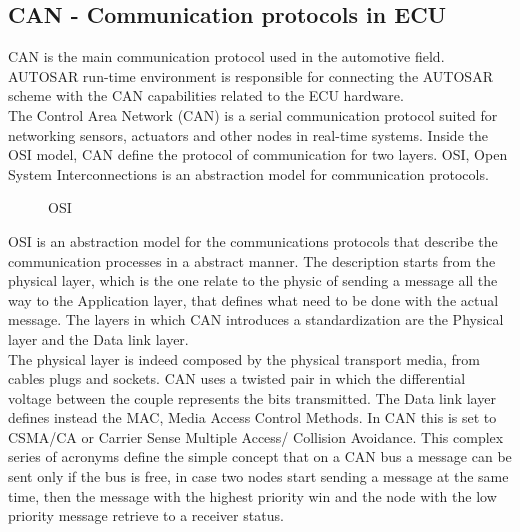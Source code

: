 \documentclass[../main.tex]{subfiles}
\begin{document}
\subsection{CAN - Communication protocols in ECU}
\gls{CAN} is the main communication protocol used in the automotive field. \gls{AUTOSAR} run-time environment is responsible for connecting the \gls{AUTOSAR} scheme with the \gls{CAN} capabilities related to the \gls{ECU} hardware.\\
The Control Area Network (\gls{CAN}) is a serial communication protocol suited for networking sensors, actuators and other nodes in real-time systems. Inside the \gls{OSI} model, \gls{CAN} define the protocol of communication for two layers. \gls{OSI}, Open System Interconnections is an abstraction model for communication protocols. 
\begin{figure}[H]
    \centering
{}
    \caption{OSI}
    \label{fig:ECUstructure}
\end{figure}
\gls{OSI} is an abstraction model for the communications protocols that describe the communication processes in a abstract manner. The description starts from the physical layer, which is the one relate to the physic of sending a message all the way to the Application layer, that defines what need to be done with the actual message. The layers in which \gls{CAN} introduces a standardization are the Physical layer and the Data link layer.\\
The physical layer is indeed composed by the physical transport media, from cables plugs and sockets. \gls{CAN} uses a twisted pair in which the differential voltage between the couple represents the bits transmitted. The Data link layer defines instead the \gls{MAC}, Media Access Control Methods. In \gls{CAN} this is set to \gls{CSMA/CA} or Carrier Sense Multiple Access/ Collision Avoidance. This complex series of acronyms define the simple concept that on a \gls{CAN} \gls{bus} a message can be sent only if the \gls{bus} is free, in case two nodes start sending a message at the same time, then the message with the highest priority win and the node with the low priority message retrieve to a receiver status.
\end{document}
